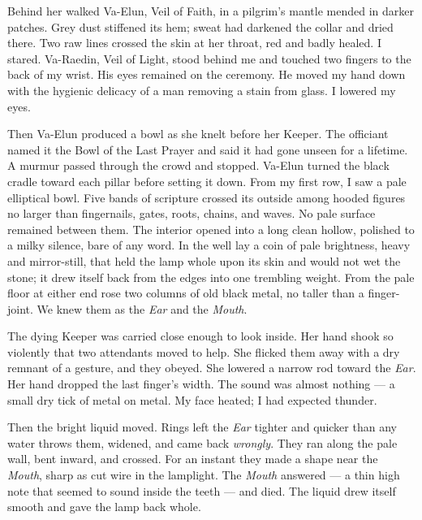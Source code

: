 Behind her walked Va-Elun, Veil of Faith, in a pilgrim's mantle mended in darker patches. Grey dust stiffened its hem; sweat had darkened the collar and dried there. Two raw lines crossed the skin at her throat, red and badly healed. I stared. Va-Raedin, Veil of Light, stood behind me and touched two fingers to the back of my wrist. His eyes remained on the ceremony. He moved my hand down with the hygienic delicacy of a man removing a stain from glass. I lowered my eyes.\par

Then Va-Elun produced a bowl as she knelt before her Keeper. The officiant named it the Bowl of the Last Prayer and said it had gone unseen for a lifetime. A murmur passed through the crowd and stopped. Va-Elun turned the black cradle toward each pillar before setting it down. From my first row, I saw a pale elliptical bowl. Five bands of scripture crossed its outside among hooded figures no larger than fingernails, gates, roots, chains, and waves. No pale surface remained between them. The interior opened into a long clean hollow, polished to a milky silence, bare of any word. In the well lay a coin of pale brightness, heavy and mirror-still, that held the lamp whole upon its skin and would not wet the stone; it drew itself back from the edges into one trembling weight. From the pale floor at either end rose two columns of old black metal, no taller than a finger-joint. We knew them as the \textit{Ear} and the \textit{Mouth}.\par

The dying Keeper was carried close enough to look inside. Her hand shook so violently that two attendants moved to help. She flicked them away with a dry remnant of a gesture, and they obeyed. She lowered a narrow rod toward the \textit{Ear}. Her hand dropped the last finger's width. The sound was almost nothing --- a small dry tick of metal on metal. My face heated; I had expected thunder.\par

Then the bright liquid moved. Rings left the \textit{Ear} tighter and quicker than any water throws them, widened, and came back \textit{wrongly}. They ran along the pale wall, bent inward, and crossed. For an instant they made a shape near the \textit{Mouth}, sharp as cut wire in the lamplight. The \textit{Mouth} answered --- a thin high note that seemed to sound inside the teeth --- and died. The liquid drew itself smooth and gave the lamp back whole.\par

